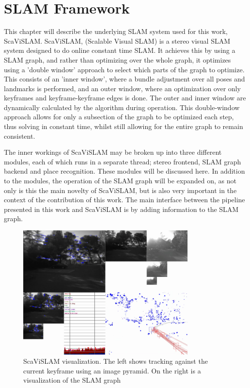 \chapter{SLAM Framework}
\label{chapter:ScaViSLAM}

This chapter will describe the underlying SLAM system used for this work, \\ \mbox{ScaViSLAM}.  \mbox{ScaViSLAM}, (Scalable Visual SLAM) is a stereo visual SLAM system designed to do online constant time SLAM. It achieves this by using a SLAM graph, and rather than optimizing over the whole graph, it optimizes using a 'double window' approach to select which parts of the graph to optimize.  This consists of an 'inner window', where a bundle adjustment over all poses and landmarks is performed, and an outer window, where an optimization over only keyframes and keyframe-keyframe edges is done. The outer and inner window are dynamically calculated by the algorithm during operation.  This double-window approach allows for only a subsection of the graph to be optimized each step, thus solving in constant time, whilst still allowing for the entire graph to remain consistent.

The inner workings of ScaViSLAM may be broken up into three different modules, each of which runs in a separate thread; stereo frontend, SLAM graph backend and place recognition. These modules will be discussed here. In addition to the modules, the operation of the SLAM graph will be expanded on, as not only is this the main novelty of ScaViSLAM, but is also very important in the context of the contribution of this work. The main interface between the pipeline presented in this work and ScaViSLAM is by adding information to the SLAM graph.

\begin{figure}[h!]
  \centering
    \includegraphics[width=0.8\textwidth]{chapters/images/scavislam_gui}
    \caption{ScaViSLAM visualization.  The left shows tracking against the current keyframe using an image pyramid.  On the right is a visualization of the SLAM graph}
  \label{fig:scavislam_gui}
\end{figure}

